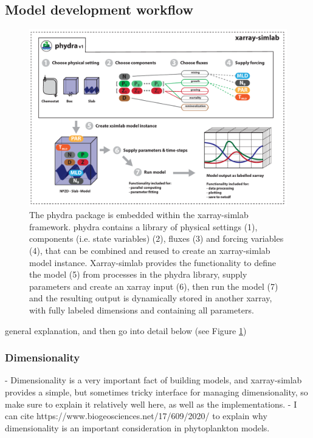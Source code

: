 \documentclass[journal abbreviation, manuscript]{copernicus}
\begin{document}
\subsection{Model development workflow}

%
\begin{figure}[t]
\includegraphics[width=12cm]{Figures/firstdraft_schematics/01__schematics_phydra.pdf}
\caption{The phydra package is embedded within the xarray-simlab framework. phydra contains a library of physical settings (1), components (i.e. state variables) (2), fluxes (3) and forcing variables (4), that can be combined and reused to create an xarray-simlab model instance. Xarray-simlab provides the functionality to define the model (5) from processes in the phydra library, supply parameters and create an xarray input (6), then run the model (7) and the resulting output is dynamically stored in another xarray, with fully labeled dimensions and containing all parameters.}
\label{phydraschematics}
\end{figure}

general explanation, and then go into detail below (see Figure \ref{phydraschematics})

\subsubsection{Dimensionality}
- Dimensionality is a very important fact of building models, and xarray-simlab provides a simple, but sometimes tricky interface for managing dimensionality, so make sure to explain it relatively well here, as well as the implementations.
- I can cite https://www.biogeosciences.net/17/609/2020/ to explain why dimensionality is an important consideration in phytoplankton models.
\end{document}
